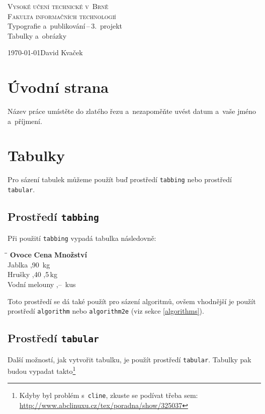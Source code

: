 \documentclass[a4paper, 11pt]{article}
\begin{document}
\begin{titlepage}
    \begin{center}
        \Huge\textsc{Vysoké učení technické v~Brně} \\
        \huge\textsc{Fakulta informačních technologií} \\
        \LARGE{Typografie a~publikování\,--\,3.~projekt} \\
        \Huge{Tabulky a~obrázky} \\
    \end{center}
    \Large{\today \hfill David Kvaček}
\end{titlepage}

\section{Úvodní strana}
    Název práce umístěte do zlatého řezu a~nezapoměňte uvést  datum a~vaše jméno a~příjmení.

\section{Tabulky}
    Pro sázení tabulek můžeme použít buď prostředí \verb|tabbing| nebo prostředí \verb|tabular|.
    
\subsection{Prostředí \texttt{tabbing}}
    Při použití \verb|tabbing| vypadá tabulka následovně:
    
\begin{tabbing}
    \hspace{1.2in}\=\hspace{1in}\=\kill
    \textbf{Ovoce} \> \textbf{Cena} \> \textbf{Množství} \\ 
    Jablka ,90 \,kg \\
    Hrušky ,40 ,5\,kg \\
    Vodní melouny ,-- \,kus \\
\end{tabbing}
    Toto prostředí se dá také použít pro sázení algoritmů, ovšem vhodnější je použít prostředí \verb|algorithm| nebo \verb|algorithm2e| (viz sekce \ref{algorithms}).
    
\subsection{Prostředí \texttt{tabular}}
    Další možností, jak vytvořit tabulku, je použít prostředí \verb|tabular|. Tabulky pak budou vypadat takto\footnote{Kdyby byl problém s~\texttt{cline}, zkuste se podívat třeba sem: \href{http://www.abclinuxu.cz/tex/poradna/show/325037}{http://www.abclinuxu.cz/tex/poradna/show/325037}}
\end{document}
